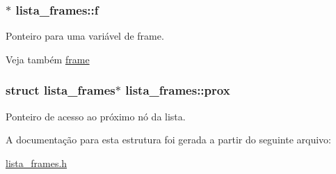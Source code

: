 \subsubsection[{\texorpdfstring{f}{f}}]{$\ast$ lista\+\_\+frames\+::f}\hypertarget{structlista__frames_ad7777179f480ab04a686cf8edf19addf}{}\label{structlista__frames_ad7777179f480ab04a686cf8edf19addf}
Ponteiro para uma variável de frame. \begin{DoxySeeAlso}{Veja também}
\hyperlink{structframe}{frame} 
\end{DoxySeeAlso}
\subsubsection[{\texorpdfstring{prox}{prox}}]{\setlength{\rightskip}{0pt plus 5cm}struct {\bf lista\+\_\+frames}$\ast$ lista\+\_\+frames\+::prox}\hypertarget{structlista__frames_ac33c75b9e66a517b493e6d35a3c1efb3}{}\label{structlista__frames_ac33c75b9e66a517b493e6d35a3c1efb3}
Ponteiro de acesso ao próximo nó da lista. 

A documentação para esta estrutura foi gerada a partir do seguinte arquivo\+:\begin{DoxyCompactItemize}
\item 
\hyperlink{lista__frames_8h}{lista\+\_\+frames.\+h}\end{DoxyCompactItemize}
